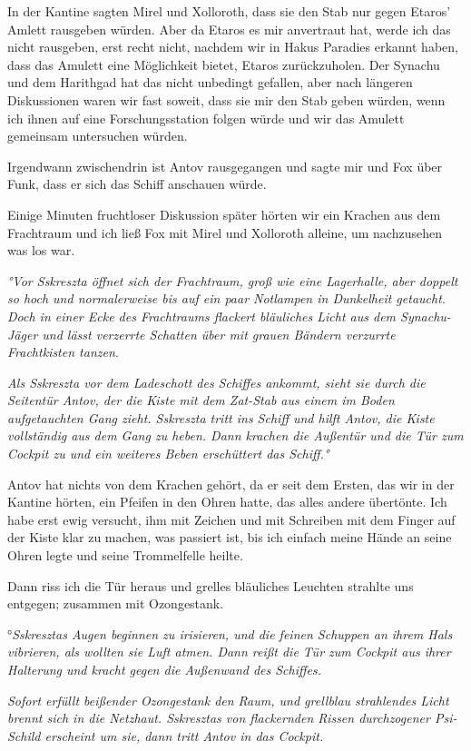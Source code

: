 \documentclass[11pt]{scrartcl}
\begin{document}
In der Kantine sagten Mirel und Xolloroth, dass sie den Stab nur gegen
Etaros' Amlett rausgeben würden. Aber da Etaros es mir anvertraut hat,
werde ich das nicht rausgeben, erst recht nicht, nachdem wir in Hakus
Paradies erkannt haben, dass das Amulett eine Möglichkeit bietet, Etaros
zurückzuholen. Der Synachu und dem Harithgad hat das nicht unbedingt
gefallen, aber nach längeren Diskussionen waren wir fast soweit, dass
sie mir den Stab geben würden, wenn ich ihnen auf eine Forschungsstation
folgen würde und wir das Amulett gemeinsam untersuchen würden.

Irgendwann zwischendrin ist Antov rausgegangen und sagte mir und Fox
über Funk, dass er sich das Schiff anschauen würde.

Einige Minuten fruchtloser Diskussion später hörten wir ein Krachen aus
dem Frachtraum und ich ließ Fox mit Mirel und Xolloroth alleine, um
nachzusehen was los war.

\emph{°Vor Sskreszta öffnet sich der Frachtraum, groß wie eine
Lagerhalle, aber doppelt so hoch und normalerweise bis auf ein paar
Notlampen in Dunkelheit getaucht. Doch in einer Ecke des Frachtraums
flackert bläuliches Licht aus dem Synachu-Jäger und lässt verzerrte
Schatten über mit grauen Bändern verzurrte Frachtkisten tanzen.}

\emph{Als Sskreszta vor dem Ladeschott des Schiffes ankommt, sieht sie
durch die Seitentür Antov, der die Kiste mit dem Zat-Stab aus einem im
Boden aufgetauchten Gang zieht. Sskreszta tritt ins Schiff und hilft
Antov, die Kiste vollständig aus dem Gang zu heben. Dann krachen die
Außentür und die Tür zum Cockpit zu und ein weiteres Beben erschüttert
das Schiff.°}

Antov hat nichts von dem Krachen gehört, da er seit dem Ersten, das wir
in der Kantine hörten, ein Pfeifen in den Ohren hatte, das alles andere
übertönte. Ich habe erst ewig versucht, ihm mit Zeichen und mit
Schreiben mit dem Finger auf der Kiste klar zu machen, was passiert ist,
bis ich einfach meine Hände an seine Ohren legte und seine Trommelfelle
heilte.

Dann riss ich die Tür heraus und grelles bläuliches Leuchten strahlte
uns entgegen; zusammen mit Ozongestank.

°\emph{Sskresztas Augen beginnen zu irisieren, und die feinen Schuppen
an ihrem Hals vibrieren, als wollten sie Luft atmen. Dann reißt die Tür
zum Cockpit aus ihrer Halterung und kracht gegen die Außenwand des
Schiffes.}

\emph{Sofort erfüllt beißender Ozongestank den Raum, und grellblau
strahlendes Licht brennt sich in die Netzhaut. Sskresztas von
flackernden Rissen durchzogener Psi-Schild erscheint um sie, dann tritt
Antov in das Cockpit.}
\end{document}
